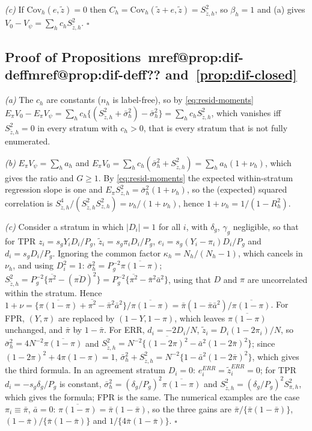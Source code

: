 \documentclass[pdflatex,sn-mathphys-num,iicol]{sn-jnl}
\makeatletter
\theoremstyle{thmstyleone}
\theoremstyle{thmstyletwo}
\theoremstyle{thmstylethree}
\newcommand{\Mref}[1]{\ifcsname mref@#1\endcsname\csname mref@#1\endcsname\else\textbf{??}\fi}
\makeatother
\begin{document}
\emph{(c)} If $\mathrm{Cov}_h(e,\tilde z)=0$ then $C_h=\mathrm{Cov}_h(\tilde z+e,\tilde z)=S^2_{\tilde z,h}$, so $\beta_h=1$ and (a) gives $V_0-V_\psi=\sum_hc_hS^2_{\tilde z,h}$. $\square$

\subsection{Proof of Propositions~\Mref{prop:dif-deff} and~\ref{prop:dif-closed}}

\emph{(a)} The $c_h$ are constants ($n_h$ is label-free), so by \eqref{eq:resid-moments}
$E_\pi V_0-E_\pi V_\psi=\sum_hc_h\{(S^2_{\tilde z,h}+\bar\sigma^2_h)-\bar\sigma^2_h\}=\sum_hc_hS^2_{\tilde z,h}$, which vanishes iff $S^2_{\tilde z,h}=0$ in every stratum with $c_h>0$, that is every stratum that is not fully enumerated.

\emph{(b)} $E_\pi V_\psi=\sum_ha_h$ and $E_\pi V_0=\sum_hc_h(\bar\sigma^2_h+S^2_{\tilde z,h})=\sum_ha_h(1+\nu_h)$, which gives the ratio and $G\ge1$. By \eqref{eq:resid-moments} the expected within-stratum
regression slope is one and $E_\pi S^2_{z,h}=\bar\sigma^2_h(1+\nu_h)$, so the (expected) squared correlation is $S^4_{\tilde z,h}/(S^2_{\tilde z,h}S^2_{z,h})=\nu_h/(1+\nu_h)$, hence $1+\nu_h=1/(1-R_h^2)$.

\emph{(c)} Consider a stratum in which $|D_i|=1$ for all $i$, with $\delta_g$, $\gamma_g$ negligible, so that for TPR $z_i=s_gY_iD_i/P_g$, $\tilde z_i=s_g\pi_iD_i/P_g$,
$e_i=s_g(Y_i-\pi_i)D_i/P_g$ and $d_i=s_gD_i/P_g$. Ignoring the common factor $\kappa_h=N_h/(N_h-1)$, which cancels in $\nu_h$, and using $D_i^2=1$:
$\bar\sigma^2_h=P_g^{-2}\overline{\pi(1-\pi)}$; $S^2_{\tilde z,h}=P_g^{-2}\{\overline{\pi^2}-(\overline{\pi D})^2\}=P_g^{-2}\{\overline{\pi^2}-\bar\pi^2\bar a^2\}$, using that $D$ and $\pi$ are uncorrelated within the stratum.
Hence $1+\nu=\{\overline{\pi(1-\pi)}+\overline{\pi^2}-\bar\pi^2\bar a^2\}/\overline{\pi(1-\pi)}=\bar\pi(1-\bar\pi\bar a^2)/\overline{\pi(1-\pi)}$. For FPR, $(Y,\pi)$ are replaced by $(1-Y,1-\pi)$, which leaves
$\overline{\pi(1-\pi)}$ unchanged, and $\bar\pi$ by $1-\bar\pi$. For ERR, $d_i=-2D_i/N$, $\tilde z_i=D_i(1-2\pi_i)/N$, so $\bar\sigma^2_h=4N^{-2}\overline{\pi(1-\pi)}$ and
$S^2_{\tilde z,h}=N^{-2}\{\overline{(1-2\pi)^2}-\bar a^2(1-2\bar\pi)^2\}$; since $(1-2\pi)^2+4\pi(1-\pi)=1$, $\bar\sigma^2_h+S^2_{\tilde z,h}=N^{-2}\{1-\bar a^2(1-2\bar\pi)^2\}$, which gives the third formula. In an agreement stratum
$D_i=0$: $e^{ERR}_i=\tilde z^{ERR}_i=0$; for TPR $d_i=-s_g\delta_g/P_g$ is constant, $\bar\sigma^2_h=(\delta_g/P_g)^2\overline{\pi(1-\pi)}$ and $S^2_{\tilde z,h}=(\delta_g/P_g)^2S^2_{\pi,h}$, which gives the formula; FPR is the same.
The numerical examples are the case $\pi_i\equiv\bar\pi$, $\bar a=0$: $\overline{\pi(1-\pi)}=\bar\pi(1-\bar\pi)$, so the three gains are $\bar\pi/\{\bar\pi(1-\bar\pi)\}$, $(1-\bar\pi)/\{\bar\pi(1-\bar\pi)\}$ and $1/\{4\bar\pi(1-\bar\pi)\}$. $\square$
\end{document}
